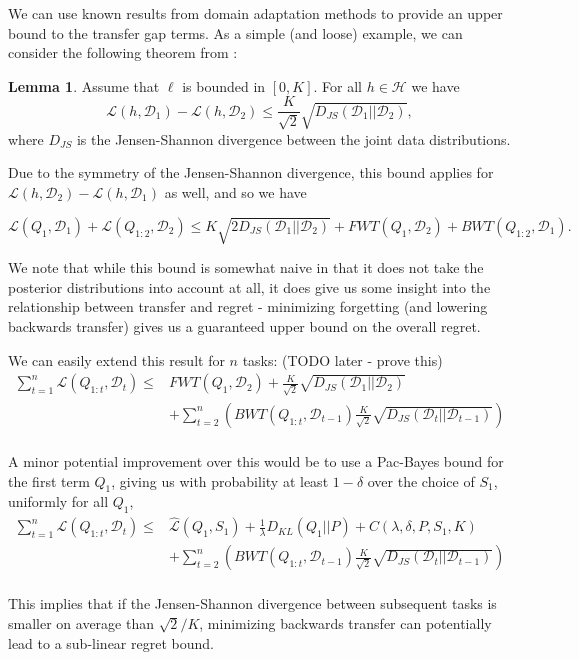 \documentclass[letterpaper]{article}
\theoremstyle{definition}
\newtheorem{lemma}{Lemma}[section]
\begin{document}
We can use known results from domain adaptation methods to provide an upper bound to the transfer gap terms. As a simple (and loose) example, we can consider the following theorem from \citet{shui2020beyond}:

\begin{lemma}
	Assume that $\ell$ is bounded in $[0, K]$. For all $h\in \mathcal{H}$ we have
	$$\mathcal{L}(h, \mathcal{D}_1)-\mathcal{L}(h, \mathcal{D}_2)\leq \frac{K}{\sqrt{2}}\sqrt{D_{JS}(\mathcal{D}_1||\mathcal{D}_2)},$$ 
	where $D_{JS}$ is the Jensen-Shannon divergence between the joint data distributions.
\end{lemma}

Due to the symmetry of the Jensen-Shannon divergence, this bound applies for $\mathcal{L}(h, \mathcal{D}_2)-\mathcal{L}(h, \mathcal{D}_1)$ as well, and so we have

\begin{equation}
\mathcal{L}(Q_1, \mathcal{D}_1)+\mathcal{L}(Q_{1:2}, \mathcal{D}_2) \leq 
K\sqrt{2 D_{JS}(\mathcal{D}_1||\mathcal{D}_2)}+FWT(Q_1, \mathcal{D}_2)+ BWT(Q_{1:2}, \mathcal{D}_1).
\end{equation}

We note that while this bound is somewhat naive in that it does not take the posterior distributions into account at all, it does give us some insight into the relationship between transfer and regret - minimizing forgetting (and lowering backwards transfer) gives us a guaranteed upper bound on the overall regret. 

We can easily extend this result for $n$ tasks: (TODO later - prove this) %
\begin{equation}
\begin{split}
 \sum_{t=1}^{n}\mathcal{L}(Q_{1:t}, \mathcal{D}_t) \leq &  FWT(Q_1, \mathcal{D}_2) + \frac{K}{\sqrt{2}}\sqrt{D_{JS}(\mathcal{D}_{1}||\mathcal{D}_{2})} \\ &+ \sum_{t=2}^{n}\left ( BWT(Q_{1:t}, \mathcal{D}_{t-1}) \frac{K}{\sqrt{2}}\sqrt{D_{JS}(\mathcal{D}_{t}||\mathcal{D}_{t-1})}\right ) \\&
 \end{split}
\end{equation}

A minor potential improvement over this would be to use a Pac-Bayes bound for the first term $Q_1$, giving us with probability at least $1-\delta$ over the choice of $S_1$, uniformly for all $Q_1$,
\begin{equation}
\begin{split}
\sum_{t=1}^{n}\mathcal{L}(Q_{1:t}, \mathcal{D}_t) \leq &  \hat{\mathcal{L}}(Q_1, S_1)+\frac{1}{\lambda}D_{KL}(Q_1||P)+C(\lambda,\delta,P,S_1, K) \\ &+ \sum_{t=2}^{n}\left ( BWT(Q_{1:t}, \mathcal{D}_{t-1}) \frac{K}{\sqrt{2}}\sqrt{D_{JS}(\mathcal{D}_{t}||\mathcal{D}_{t-1})}\right ) \\&
\end{split}
\end{equation}

This implies that if the Jensen-Shannon divergence between subsequent tasks is smaller on average than $\sqrt{2}/K$, minimizing backwards transfer can potentially lead to a sub-linear regret bound.

\clearpage


\end{document}
